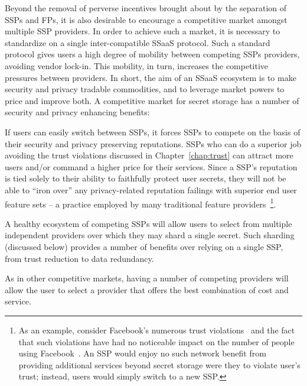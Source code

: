 Beyond the removal of perverse incentives brought about by the
separation of SSPs and FPs, it is also desirable to encourage a
competitive market amongst multiple SSP providers. In order to achieve
such a market, it is necessary to standardize on a single
inter-compatible SSaaS protocol. Such a standard protocol gives users
a high degree of mobility between competing SSPs providers, avoiding
vendor lock-in. This mobility, in turn, increases the competitive
pressures between providers. In short, the aim of an SSaaS ecosystem
is to make security and privacy tradable commodities, and to leverage
market powers to price and improve both. A competitive market for
secret storage has a number of security and privacy enhancing
benefits:

\begin{packed_desc}
\item[Reputation:] If users can easily switch between SSPs, it forces
  SSPs to compete on the basis of their security and privacy
  preserving reputations. SSPs who can do a superior job avoiding the
  trust violations discussed in Chapter~\ref{chap:trust} can attract
  more users and/or command a higher price for their services. Since a
  SSP's reputation is tied solely to their ability to faithfully
  protect user secrets, they will not be able to ``iron over'' any
  privacy-related reputation failings with superior end user feature
  sets -- a practice employed by many traditional feature
  providers~\footnote{As an example, consider Facebook's numerous
    trust violations~\cite{goel2014, lomas2014, tsukayama2014} and the
    fact that such violations have had no noticeable impact on the
    number of people using Facebook~\cite{foster2014}. An SSP would
    enjoy no such network benefit from providing additional services
    beyond secret storage were they to violate user's trust; instead,
    users would simply switch to a new SSP.}.
\item[Multiple Providers:] A healthy ecosystem of competing SSPs will
  allow users to select from multiple independent providers over which
  they may shard a single secret. Such sharding (discussed below)
  provides a number of benefits over relying on a single SSP, from
  trust reduction to data redundancy.
\item[Cost:] As in other competitive markets, having a number of
  competing providers will allow the user to select a provider that
  offers the best combination of cost and service.
\end{packed_desc}

